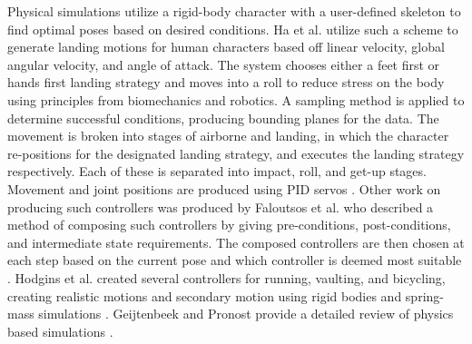 		
Physical simulations utilize a rigid-body character with a user-defined skeleton to find optimal poses based on desired conditions.  Ha et al. utilize such a scheme to generate landing motions for human characters based off linear velocity, global angular velocity, and angle of attack.  The system chooses either a feet first or hands first landing strategy and moves into a roll to reduce stress on the body using principles from biomechanics and robotics.  A sampling method is applied to determine successful conditions, producing bounding planes for the data.  The movement is broken into stages of airborne and landing, in which the character re-positions for the designated landing strategy, and executes the landing strategy respectively. Each of these is separated into impact, roll, and get-up stages.  Movement and joint positions are produced using PID servos \cite{falling_landing}.  Other work on producing such controllers was produced by Faloutsos et al. who described a method of composing such controllers by giving pre-conditions, post-conditions, and intermediate state requirements.  The composed controllers are then chosen at each step based on the current pose and which controller is deemed most suitable \cite{composable_controllers}.  Hodgins et al. created several controllers for running, vaulting, and bicycling, creating realistic motions and secondary motion using rigid bodies and spring-mass simulations \cite{anim_human_athletics}.  Geijtenbeek and Pronost provide a detailed review of physics based simulations \cite{inter_physics_anim}.